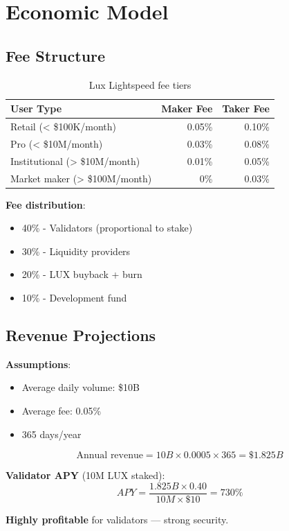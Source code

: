 \section{Economic Model}


\subsection{Fee Structure}

\begin{table}[h]
\centering
\begin{tabular}{lrr}
\toprule
\textbf{User Type} & \textbf{Maker Fee} & \textbf{Taker Fee} \\
\midrule
Retail (< \$100K/month) & 0.05\% & 0.10\% \\
Pro (< \$10M/month) & 0.03\% & 0.08\% \\
Institutional (> \$10M/month) & 0.01\% & 0.05\% \\
Market maker (> \$100M/month) & 0\% & 0.03\% \\
\bottomrule
\end{tabular}
\caption{Lux Lightspeed fee tiers}
\end{table}

\textbf{Fee distribution}:
\begin{itemize}
    \item 40\% - Validators (proportional to stake)
    \item 30\% - Liquidity providers
    \item 20\% - LUX buyback + burn
    \item 10\% - Development fund
\end{itemize}

\subsection{Revenue Projections}

\textbf{Assumptions}:
\begin{itemize}
    \item Average daily volume: \$10B
    \item Average fee: 0.05\%
    \item 365 days/year
\end{itemize}

\begin{equation}
\text{Annual revenue} = 10B \times 0.0005 \times 365 = \$1.825B
\end{equation}

\textbf{Validator APY} (10M LUX staked):
\begin{equation}
APY = \frac{1.825B \times 0.40}{10M \times \$10} = 730\%
\end{equation}

\textbf{Highly profitable} for validators --- strong security.

